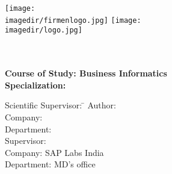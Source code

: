 \begin{titlepage}
    \begin{minipage}{\textwidth}
            \vspace{-2cm}
            \noindent \texttt{[image: \\imagedir/firmenlogo.jpg]} \hfill 
            \texttt{[image: \\imagedir/logo.jpg]}
    \end{minipage}
    \vspace{1em}
    \begin{center}
        {\textsf{\textbf{\large{\DieArtDerArbeit}}}}\\[6mm]
        {\textsf{\textbf{\Large{}\DerTitelDerArbeit}}} \\[1.5cm]
        {\textsf{\textbf{\large{}Course of Study: Business Informatics}}}\\[6mm]
        {\textsf{\textbf{Specialization: \DieStudienrichtung}}}\vspace{10em}
        
        \begin{minipage}{\textwidth}
            \begin{tabbing}
            Scientific Supervisor: \hspace{0.85cm}\=\kill
            Author: \> \DerAutorDerArbeit \\[1.5mm]
            Company: \> \DerNameDerFirma  \\[1.5mm]
            Department: \> \DerNameDerAbteilung \\[1.5mm]
            Supervisor: \> \DerFirmenBetreuer \\[1.5mm]
            Company: \> SAP Labs India \\[1.5mm]
            Department: \> MD's office \\[1.5mm]
            \end{tabbing}
        \end{minipage}
        
    \end{center}
    \end{titlepage}